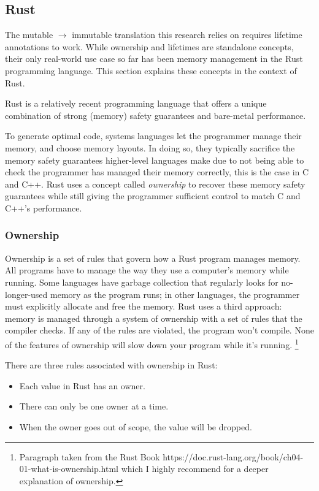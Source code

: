 \documentclass[12pt,twoside]{report}
\begin{document}
\subsection{Rust}
The mutable $\rightarrow$ immutable translation this research relies on requires lifetime annotations to work. While ownership and lifetimes are standalone concepts, their only real-world use case so far has been memory management in the Rust programming language. This section explains these concepts in the context of Rust.

Rust is a relatively recent programming language that offers a unique combination of strong (memory) safety guarantees and bare-metal performance.

To generate optimal code, systems languages let the programmer manage their memory, and choose memory layouts. In doing so, they typically sacrifice the memory safety guarantees higher-level languages make due to not being able to check the programmer has managed their memory correctly, this is the case in C and C++. Rust uses a concept called \textit{ownership} to recover these memory safety guarantees while still giving the programmer sufficient control to match C and C++'s performance.

\subsubsection{Ownership}
Ownership is a set of rules that govern how a Rust program manages memory. All programs have to manage the way they use a computer’s memory while running. Some languages have garbage collection that regularly looks for no-longer-used memory as the program runs; in other languages, the programmer must explicitly allocate and free the memory. Rust uses a third approach: memory is managed through a system of ownership with a set of rules that the compiler checks. If any of the rules are violated, the program won’t compile. None of the features of ownership will slow down your program while it’s running. \footnote{Paragraph taken from the Rust Book https://doc.rust-lang.org/book/ch04-01-what-is-ownership.html which I highly recommend for a deeper explanation of ownership.}

There are three rules associated with ownership in Rust:
\begin{itemize}
  \item Each value in Rust has an owner.
  \item There can only be one owner at a time.
  \item When the owner goes out of scope, the value will be dropped.
\end{itemize}
\end{document}
